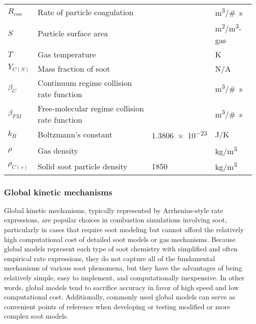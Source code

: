 \documentclass[preprint,12pt,letterpaper]{elsarticle}
\begin{document}
\begin{table}
{\begin{tabular}{l l l l}
            $R_{coa}$       & Rate of particle coagulation             &        & \si{m^{3}/\# s} \\
            $S$             & Particle surface area                    &        & \si{m^2/m^3}-gas \\
            $T$             & Gas temperature                          &        & \si{K} \\
            $Y_{C(S)}$      & Mass fraction of soot                    &        & N/A \\
            $\beta_{C}$     & Continuum regime collision rate function      &        & \si{m^{3}/\# s} \\
            $\beta_{FM}$    & Free-molecular regime collision rate function &        & \si{m^{3}/\# s} \\
            $k_B$        & Boltzmann's constant                     & \num{1.3806e-23} & \si{J/K} \\
            $\rho$          & Gas density                              &        & \si{kg/m^3} \\
            $\rho_{C(s)}$   & Solid soot particle density              & 1850   & \si{kg/m^3} \\
            \hline
        \end{tabular}
    }
\end{table}

\subsubsection{Global kinetic mechanisms}
\label{sss:global}

Global kinetic mechanisms, typically represented by Arrhenius-style rate expressions, are popular choices in combustion simulations involving soot, particularly in cases that require soot modeling but cannot afford the relatively high computational cost of detailed soot models or gas mechanisms. Because global models represent each type of soot chemistry with simplified and often empirical rate expressions, they do not capture all of the fundamental mechanisms of various soot phenomena, but they have the advantages of being relatively simple, easy to implement, and computationally inexpensive. In other words, global models tend to sacrifice accuracy in favor of high speed and low computational cost. Additionally, commonly used global models can serve as convenient points of reference when developing or testing modified or more complex soot models.
\end{document}
